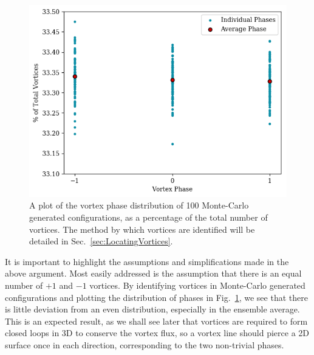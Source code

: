 %
\begin{figure}[h]
\includegraphics{./VortexDistribution.png}
\caption{\label{fig:VortexDistribution}A plot of the vortex phase distribution of 100 Monte-Carlo generated configurations, as a percentage of the total number of vortices. The method by which vortices are identified will be detailed in Sec.~\ref{sec:LocatingVortices}.}
\end{figure}
%
It is important to highlight the assumptions and simplifications made in the above argument. Most easily addressed is the assumption that there is an equal number of $+1$ and $-1$ vortices. By identifying vortices in Monte-Carlo generated configurations and plotting the distribution of phases in Fig.~\ref{fig:VortexDistribution}, we see that there is little deviation from an even distribution, especially in the ensemble average. This is an expected result, as we shall see later that vortices are required to form closed loops in 3D to conserve the vortex flux, so a vortex line should pierce a 2D surface once in each direction, corresponding to the two non-trivial phases.\\

